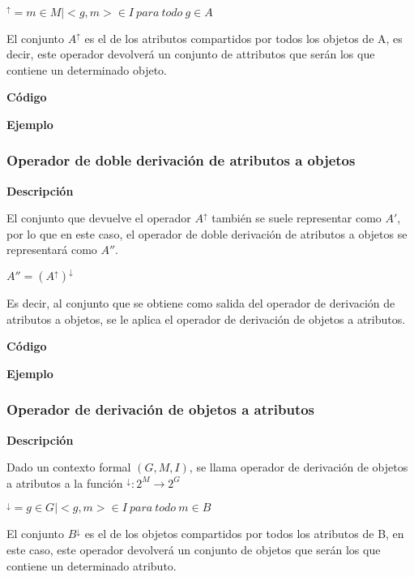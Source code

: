         \( ^\uparrow = { m \in M | <g,m> \in I ~ para ~ todo ~ g \in A } \)

        El conjunto \( A^\uparrow \) es el de los atributos compartidos por todos los objetos de A, es decir, este operador devolver\'a 
        un conjunto de attributos que ser\'an los que contiene un determinado objeto.


        \textbf{C\'odigo}

        


        \textbf{Ejemplo}


    \subsubsection{Operador de doble derivaci\'on de atributos a objetos}

        \textbf{Descripci\'on}

        El conjunto que devuelve el operador \( A^\uparrow \) tambi\'en se suele representar como \( A' \), por lo que en este caso, 
        el operador de doble derivaci\'on de atributos a objetos se representar\'a como \( A'' \).


        \( A'' = (A^\uparrow)^\downarrow \)

        Es decir, al conjunto que se obtiene como salida del operador de derivaci\'on de atributos a objetos, se le aplica el operador 
        de derivaci\'on de objetos a atributos.


        \textbf{C\'odigo}

        


        \textbf{Ejemplo}


    \subsubsection{Operador de derivaci\'on de objetos a atributos}

        \textbf{Descripci\'on}

        Dado un contexto formal \( (G, M, I) \), se llama operador de derivaci\'on de objetos a atributos a la 
        funci\'on \( ^\downarrow : 2^M \rightarrow 2^G \)

        \( ^\downarrow = { g \in G | <g,m> \in I ~ para ~ todo ~ m \in B } \)

        El conjunto \( B^\downarrow \) es el de los objetos compartidos por todos los atributos de B, en este caso, este operador devolver\'a 
        un conjunto de objetos que ser\'an los que contiene un determinado atributo.

